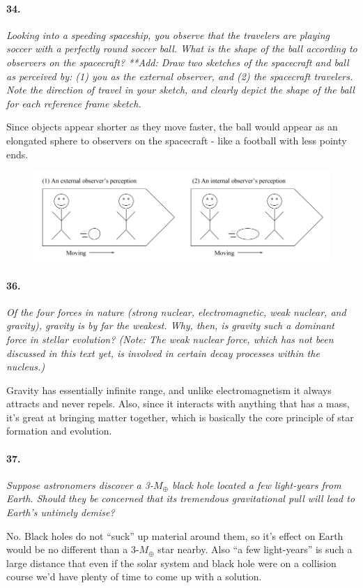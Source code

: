 \documentclass[letterpaper,11pt]{article}
\begin{document}
\paragraph{34.}
\it
Looking into a speeding spaceship, you observe that the travelers are playing soccer with a perfectly round soccer ball. What is the shape of the ball according to observers on the spacecraft? **Add: Draw two sketches of the spacecraft and ball as perceived by: (1) you as the external observer, and (2) the spacecraft travelers. Note the direction of travel in your sketch, and clearly depict the shape of the ball for each reference frame sketch.
\smallskip
	\par
	\normalfont
	Since objects appear shorter as they move faster, the ball would appear as an elongated sphere to observers on the spacecraft - like a football with less pointy ends.
	\begin{figure}[h]
		\centering
		\includegraphics[scale=0.5]{hw4sketch}
	\end{figure}



\paragraph{36.}
\it
Of the four forces in nature (strong nuclear, electromagnetic, weak nuclear, and gravity), gravity is by far the weakest. Why, then, is gravity such a dominant force in stellar evolution? (Note: The weak nuclear force, which has not been discussed in this text yet, is involved in certain decay processes within the nucleus.)
\smallskip
	\par
	\normalfont
	Gravity has essentially infinite range, and unlike electromagnetism it always attracts and never repels. Also, since it interacts with anything that has a mass, it's great at bringing matter together, which is basically the core principle of star formation and evolution.



\paragraph{37.}
\it
Suppose astronomers discover a 3-$M_\oplus$ black hole located a few light-years from Earth. Should they be concerned that its tremendous gravitational pull will lead to Earth’s untimely demise?
\smallskip
	\par
	\normalfont
	No. Black holes do not ``suck'' up material around them, so it's effect on Earth would be no different than a 3-$M_\oplus$ star nearby. Also ``a few light-years'' is such a large distance that even if the solar system and black hole were on a collision course we'd have plenty of time to come up with a solution.
\bigskip
\end{document}
